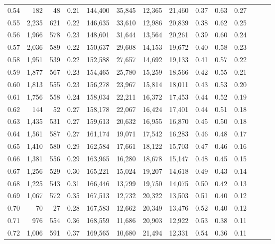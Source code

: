 \begin{tabular}{rrrrrrrrrrrrrr}
0.54 &    182 &     48 &  0.21 &  144,400 &   35,845 &  12,365 &  21,460 &  0.37 &  0.63 &      0.27 \\
0.55 &  2,235 &    621 &  0.22 &  146,635 &   33,610 &  12,986 &  20,839 &  0.38 &  0.62 &      0.25 \\
0.56 &  1,966 &    578 &  0.23 &  148,601 &   31,644 &  13,564 &  20,261 &  0.39 &  0.60 &      0.24 \\
0.57 &  2,036 &    589 &  0.22 &  150,637 &   29,608 &  14,153 &  19,672 &  0.40 &  0.58 &      0.23 \\
0.58 &  1,951 &    539 &  0.22 &  152,588 &   27,657 &  14,692 &  19,133 &  0.41 &  0.57 &      0.22 \\
0.59 &  1,877 &    567 &  0.23 &  154,465 &   25,780 &  15,259 &  18,566 &  0.42 &  0.55 &      0.21 \\
0.60 &  1,813 &    555 &  0.23 &  156,278 &   23,967 &  15,814 &  18,011 &  0.43 &  0.53 &      0.20 \\
0.61 &  1,756 &    558 &  0.24 &  158,034 &   22,211 &  16,372 &  17,453 &  0.44 &  0.52 &      0.19 \\
0.62 &    144 &     52 &  0.27 &  158,178 &   22,067 &  16,424 &  17,401 &  0.44 &  0.51 &      0.18 \\
0.63 &  1,435 &    531 &  0.27 &  159,613 &   20,632 &  16,955 &  16,870 &  0.45 &  0.50 &      0.18 \\
0.64 &  1,561 &    587 &  0.27 &  161,174 &   19,071 &  17,542 &  16,283 &  0.46 &  0.48 &      0.17 \\
0.65 &  1,410 &    580 &  0.29 &  162,584 &   17,661 &  18,122 &  15,703 &  0.47 &  0.46 &      0.16 \\
0.66 &  1,381 &    556 &  0.29 &  163,965 &   16,280 &  18,678 &  15,147 &  0.48 &  0.45 &      0.15 \\
0.67 &  1,256 &    529 &  0.30 &  165,221 &   15,024 &  19,207 &  14,618 &  0.49 &  0.43 &      0.14 \\
0.68 &  1,225 &    543 &  0.31 &  166,446 &   13,799 &  19,750 &  14,075 &  0.50 &  0.42 &      0.13 \\
0.69 &  1,067 &    572 &  0.35 &  167,513 &   12,732 &  20,322 &  13,503 &  0.51 &  0.40 &      0.12 \\
0.70 &     70 &     27 &  0.28 &  167,583 &   12,662 &  20,349 &  13,476 &  0.52 &  0.40 &      0.12 \\
0.71 &    976 &    554 &  0.36 &  168,559 &   11,686 &  20,903 &  12,922 &  0.53 &  0.38 &      0.11 \\
0.72 &  1,006 &    591 &  0.37 &  169,565 &   10,680 &  21,494 &  12,331 &  0.54 &  0.36 &      0.11 \\

\end{tabular}
